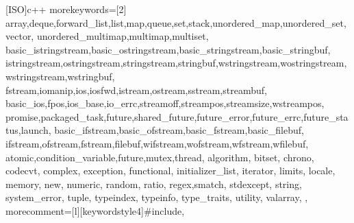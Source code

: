 [ISO]{c++}
{
    morekeywords=[2]{
        array,deque,forward_list,list,map,queue,set,stack,unordered_map,unordered_set,vector,
        unordered_multimap,multimap,multiset,
        basic_istringstream,basic_ostringstream,basic_stringstream,basic_stringbuf,
        istringstream,ostringstream,stringstream,stringbuf,wstringstream,wostringstream,wstringstream,wstringbuf,
        fstream,iomanip,ios,iosfwd,istream,ostream,sstream,streambuf,
        basic_ios,fpos,ios_base,io_errc,streamoff,streampos,streamsize,wstreampos,
        promise,packaged_task,future,shared_future,future_error,future_errc,future_status,launch,
        basic_ifstream,basic_ofstream,basic_fstream,basic_filebuf,
        ifstream,ofstream,fstream,filebuf,wifstream,wofstream,wfstream,wfilebuf,
        atomic,condition_variable,future,mutex,thread,
        algorithm,
        bitset,
        chrono,
        codecvt,
        complex,
        exception,
        functional,
        initializer_list,
        iterator,
        limits,
        locale,
        memory,
        new,
        numeric,
        random,
        ratio,
        regex,smatch,
        stdexcept,
        string,
        system_error,
        tuple,
        typeindex,
        typeinfo,
        type_traits,
        utility,
        valarray,
    },
    morecomment=[l][keywordstyle4]{\#include},
}

